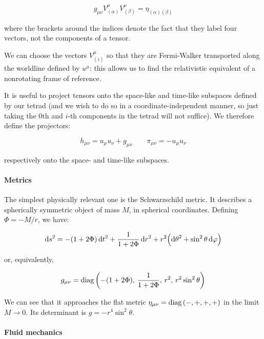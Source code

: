 \documentclass[main.tex]{subfiles}
\begin{document}
\begin{equation}
    g_{\mu\nu} V^\mu _{(\alpha)} V^\nu _{(\beta)} = \eta_{(\alpha) (\beta)}
\end{equation}

where the brackets around the indices denote the fact that they label four vectors, not the components of a tensor.

We can choose the vectors \(V_{(i)}^\mu\) so that they are Fermi-Walker transported along the worldline defined by \(u^\mu\): this allows us to find the relativistic equivalent of a nonrotating frame of reference.

It is useful to project tensors onto the space-like and time-like subspaces defined by our tetrad (and we wish to do so in a coordinate-independent manner,  so just taking the 0th and $i $-th components in the tetrad will not suffice). We therefore define the projectors:

\begin{equation}
    h_{\mu \nu} = u_\mu u_\nu + g_{\mu \nu} \qquad \pi_{\mu\nu} = -u_\mu u_\nu
\end{equation}

respectively onto the space- and time-like subspaces.

\paragraph{Metrics}

The simplest physically relevant one is the Schwarzschild metric. It describes a spherically symmetric object of mass $M$, in spherical coordinates. Defining $\Phi = -M/r$, we have:

\begin{equation}
    \dd{s}^2 = -(1+2\Phi)\dd{t}^2 + \frac{1}{1+2\Phi} \dd{r}^2
    + r^2 \qty(\dd{\theta}^2 + \sin^2\theta \dd{\varphi}) \label{eq:schwartzshild-line-element}
\end{equation}

or, equivalently,

\begin{equation}
    g_{\mu\nu} =  \diag\qty(-(1+2\Phi),\, \frac{1}{1+2\Phi},\, r^2,\, r^2 \sin ^2 \theta )
\end{equation}

We can see that it approaches the flat metric $\eta_{\mu\nu} = \operatorname{diag}\qty(-, +, +, +)$ in the limit $M\rightarrow 0$. Its determinant is $g = -r^4 \sin^2 \theta$.

\paragraph{Fluid mechanics}
\end{document}
